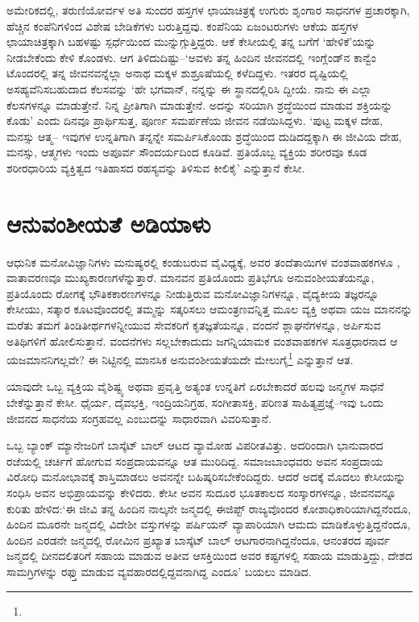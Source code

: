 ಅಮೇರಿಕದಲ್ಲಿ, ತರುಣಿಯೋರ್ವಳ ಅತಿ ಸುಂದರ ಹಸ್ತಗಳ ಛಾಯಾಚಿತ್ರಕ್ಕೆ ಉಗುರು ಶೃಂಗಾರ ಸಾಧನಗಳ ಪ್ರಚಾರಕ್ಕಾಗಿ, ಹೆಚ್ಚಿನ ಕಂಪೆನಿಗಳಿಂದ ವಿಶೇಷ ಬೇಡಿಕೆಗಳು ಬರುತ್ತಿದ್ದವು. ಕಂಪೆನಿಯ ಏಜಂಟರುಗಳು ಆಕೆಯ ಹಸ್ತಗಳ ಛಾಯಾಚಿತ್ರಕ್ಕಾಗಿ ಬಹಳಷ್ಟು ಸ್ಪರ್ಧೆಯಿಂದ ಮುನ್ನುಗ್ಗುತ್ತಿದ್ದರು. ಆಕೆ ಕೇಸೀಯಲ್ಲಿ ತನ್ನ ಬಗೆಗೆ ‘ಹೇಳಿಕೆ’ಯನ್ನು ನೀಡಬೇಕೆಂದು ಕೇಳಿ ಕೊಂಡಳು. ಆಗ ತಿಳಿದುದಿಷ್ಟು–‘ಅವಳು ತನ್ನ ಹಿಂದಿನ ಜೀವನದಲ್ಲಿ ಇಂಗ್ಲೆಂಡ್​ನ ಕಾನ್ವೆಂ ಟೊಂದರಲ್ಲಿ ತನ್ನ ಜೀವನವನ್ನೆಲ್ಲಾ ಅನಾಥ ಮಕ್ಕಳ ಶುಶ್ರೂಷೆಯಲ್ಲಿ ಕಳೆದಿದ್ದಳು. ಇತರರ ದೃಷ್ಟಿಯಲ್ಲಿ ಅಸಹ್ಯವೆನಿಸಬಹುದಾದ ಕೆಲಸವನ್ನು ‘ಹೇ ಭಗವಾನ್, ನನ್ನನ್ನು ಈ ಸ್ಥಾನದಲ್ಲಿರಿಸಿ ದ್ದೀಯೆ. ನಾನು ಈ ಎಲ್ಲಾ ಕೆಲಸಗಳನ್ನೂ ಮಾಡುತ್ತೇನೆ. ನಿನ್ನ ಪ್ರೀತಿಗಾಗಿ ಮಾಡುತ್ತೇನೆ. ಅದನ್ನು ಸರಿಯಾಗಿ ಶ್ರದ್ಧೆಯಿಂದ ಮಾಡುವ ಶಕ್ತಿಯನ್ನು ಕೊಡು’ ಎಂದು ದಿನವೂ ಪ್ರಾರ್ಥಿಸುತ್ತ, ಪೂರ್ಣ ಸಮರ್ಪಣೆಯ ಜೀವನ ನಡೆಯಿಸಿದ್ದಳು. ‘ಪುಟ್ಟ ಮಕ್ಕಳ ದೇಹ, ಮನಸ್ಸು ಆತ್ಮ– ಇವುಗಳ ಉನ್ನತಿಗಾಗಿ ತನ್ನನ್ನೇ ಸಮರ್ಪಿಸಿಕೊಂಡು ಶ್ರದ್ಧೆಯಿಂದ ದುಡಿದದ್ದಕ್ಕಾಗಿ ಈ ಜೀವಿಯ ದೇಹ, ಮನಸ್ಸು, ಆತ್ಮಗಳು ಇಂದು ಅಪೂರ್ವ ಸೌಂದರ್ಯದಿಂದ ಕೂಡಿವೆ. ಪ್ರತಿಯೊಬ್ಬ ವ್ಯಕ್ತಿಯ ಶರೀರವೂ ಕೂಡ ಶರೀರಧಾರಿಯ ವ್ಯಕ್ತಿತ್ವದ ಇತಿಹಾಸದ ರಹಸ್ಯವನ್ನು ತಿಳಿಸುವ ಕೀಲಿಕೈ’ ಎನ್ನುತ್ತಾನೆ ಕೇಸೀ.


\section{ಆನುವಂಶೀಯತೆ ಅಡಿಯಾಳು}

ಆಧುನಿಕ ಮನೋವಿಜ್ಞಾನಿಗಳು ಮನುಷ್ಯರಲ್ಲಿ ಕಂಡುಬರುವ ವೈವಿಧ್ಯಕ್ಕೆ, ಅವರ ತಂದೆತಾಯಿಗಳ ವಂಶವಾಹಕಗಳೂ , ವಾತಾವರಣವೂ ಮುಖ್ಯಕಾರಣಗಳೆನ್ನುತ್ತಾರೆ. ಮಾನವನ ಪ್ರತಿಯೊಂದು ಪ್ರತಿಭೆಗೂ ಅನುವಂಶೀಯತೆಯನ್ನೂ, ಪ್ರತಿಯೊಂದು ರೋಗಕ್ಕೆ ಭೌತಿಕಕಾರಣಗಳನ್ನೂ ನೀಡುತ್ತಿರುವ ಮನೋವಿಜ್ಞಾನಿಗಳನ್ನೂ, ವೈದ್ಯಕೀಯ ತಜ್ಞರನ್ನೂ ಕೇಸೀಯು, ಸತ್ಕಾರ ಕೂಟವೊಂದರಲ್ಲಿ ತಮ್ಮನ್ನು ಸತ್ಕರಿಸಲು ಆಮಂತ್ರಣವನ್ನಿತ್ತ ಮೂಲ ವ್ಯಕ್ತಿ ಅಥವಾ ಯಜ ಮಾನನನ್ನು ಮರೆತು ತಮಗೆ ತಿಂಡಿತೀರ್ಥಗಳನ್ನೀಯುವ ಸೇವಕರಿಗೆ ಕೃತಜ್ಞತೆಯನ್ನೂ, ವಂದನೆ ಶ್ಲಾಘನೆಗಳನ್ನೂ, ಅರ್ಪಿಸುವ ಅತಿಥಿಗಳಿಗೆ ಹೋಲಿಸುತ್ತಾನೆ. ವಂದನೆಗಳು ಸಲ್ಲಬೇಕಾದುದು ಜಗನ್ನಿಯಾಮಕ ವಂಶವಾಹಕಗಳ ಸೂತ್ರಧಾರನಾದ ಆ ಯಜಮಾನನಿಗಲ್ಲವೇ? ಈ ನಿಟ್ಟಿನಲ್ಲಿ ಮಾನಸಿಕ ಅನುವಂಶೀಯತೆಯದೇ ಮೇಲುಗೈ\footnote{} ಎನ್ನುತ್ತಾನೆ ಆತ.

ಯಾವುದೇ ಒಬ್ಬ ವ್ಯಕ್ತಿಯ ವೈಶಿಷ್ಟ್ಯ ಅಥವಾ ಪ್ರವೃತ್ತಿ ಅತ್ಯಂತ ಉನ್ನತಿಗೆ ಏರಬೇಕಾದರೆ ಹಲವು ಜನ್ಮಗಳ ಸಾಧನೆ ಬೇಕೆನ್ನುತ್ತಾನೆ ಕೇಸೀ. ಧೈರ್ಯ, ದೈವಭಕ್ತಿ, ಇಂದ್ರಿಯನಿಗ್ರಹ, ಸಂಗೀತಾಸಕ್ತಿ, ಪರಿಣತ ಸಾಹಿತ್ಯಪ್ರಜ್ಞೆ–ಇವು ಒಂದು ಜೀವನದ ಸಾಧನೆಯ ಸಂಗ್ರಹವಲ್ಲ ಎಂಬುದನ್ನು ಸಾಧಾರವಾಗಿ ವಿವರಿಸುತ್ತಾನೆ.

ಒಬ್ಬ ಬ್ಯಾಂಕ್ ಮ್ಯಾನೇಜರಿಗೆ ಬಾಸ್ಕೆಟ್ ಬಾಲ್ ಆಟದ ವ್ಯಾಮೋಹ ವಿಪರೀತವಿತ್ತು. ಅದರಿಂದಾಗಿ ಭಾನುವಾರದ ರಜೆಯಲ್ಲಿ ಚರ್ಚಿಗೆ ಹೋಗುವ ಸಂಪ್ರದಾಯವನ್ನೂ ಆತ ಮುರಿದಿದ್ದ. ಸಮಾಜಬಾಂಧವರು ಅವನ ಸಂಪ್ರದಾಯ ವಿರೋಧಿ ಮನೋಭಾವಕ್ಕೆ ಶಾಸ್ತಿಮಾಡಲು ಅವನನ್ನೇ ಬಹಿಷ್ಕರಿಸಬೇಕೆಂದಿದ್ದರು. ಆದರೆ ಅದಕ್ಕೆ ಮೊದಲು ಕೇಸೀಯನ್ನು ಸಂಧಿಸಿ ಅವನ ಅಭಿಪ್ರಾಯವನ್ನು ಕೇಳಿದರು. ಕೇಸೀ ಅವನ ಸುದೂರ ಭೂತಕಾಲದ ಸಂಸ್ಕಾರಗಳನ್ನೂ, ಜೀವನವನ್ನೂ ಕುರಿತು ಹೇಳಿದ:‘ಈ ಜೀವಿ ತನ್ನ ಹಿಂದಿನ ನಾಲ್ಕನೇ ಜನ್ಮದಲ್ಲಿ ಈಜಿಪ್ಟ್ ರಾಜ್ಯವೊಂದರ ಕೋಶಾಧಿಕಾರಿಯಾಗಿದ್ದನೆಂದೂ, ಹಿಂದಿನ ಮೂರನೇ ಜನ್ಮದಲ್ಲಿ ವಿದೇಶೀ ವಸ್ತುಗಳನ್ನು ಪರ್ಷಿಯನ್ ವ್ಯಾಪಾರಿಯಾಗಿ ಆಮದು ಮಾಡಿಕೊಳ್ಳುತ್ತಿದ್ದನೆಂದೂ, ಹಿಂದಿನ ಎರಡನೇ ಜನ್ಮದಲ್ಲಿ ರೋಮಿನ ಪ್ರಖ್ಯಾತ ಬಾಸ್ಕೆಟ್ ಬಾಲ್ ಆಟಗಾರನಾಗಿದ್ದನೆಂದೂ, ಆನಂತರದ ಪೂರ್ವ ಜನ್ಮದಲ್ಲಿ ದೀನದಲಿತರಿಗೆ ಸಹಾಯ ಮಾಡುವ ಅತೀವ ಆಸಕ್ತಿಯಿಂದ ಅವರ ಕಷ್ಟಗಳಲ್ಲಿ ಸಹಾಯ ಮಾಡುತ್ತಿದ್ದು, ದೇಶದ ಸಾಮಗ್ರಿಗಳನ್ನು ರಫ್ತು ಮಾಡುವ ವ್ಯವಹಾರದಲ್ಲಿದ್ದವನಾಗಿದ್ದ ಎಂದೂ’ ಬಯಲು ಮಾಡಿದ.

